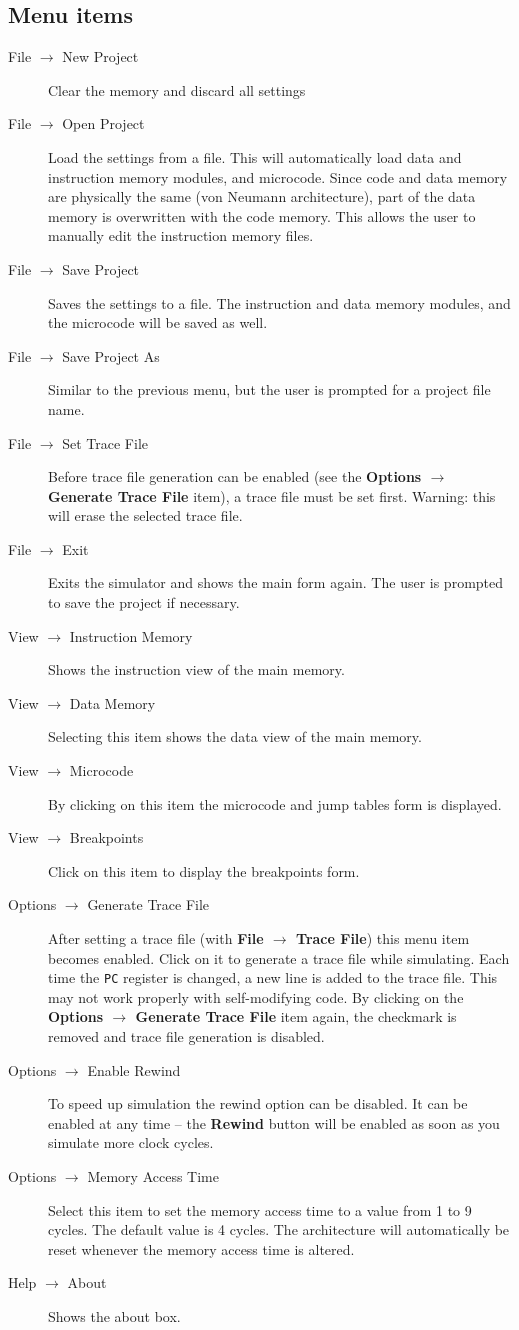 \documentclass{article}
\begin{document}
\subsection{Menu items}

\begin{description}
\item[File $\to$ New Project] Clear the memory and discard all settings
\item[File $\to$ Open Project] Load the settings from a
 file. This will automatically load data and instruction memory modules,
 and microcode. Since code and data memory are physically the same (von 
Neumann architecture), part of the data memory is overwritten with the 
code memory. This allows the user to manually edit the instruction 
memory files.
\item[File $\to$ Save Project] Saves the settings to a file. The instruction and data memory modules, and the microcode will be saved as well.
\item[File $\to$ Save Project As] Similar to the previous menu, but the user is prompted for a project file name.
\item[File $\to$ Set Trace File] Before trace file generation can be enabled (see the \textbf{Options $\to$ Generate Trace File} item), a trace file must be set first. Warning: this will erase the selected trace file.
\item[File $\to$ Exit] Exits the simulator and shows the main form again. The user is prompted to save the project if necessary.
\item[View $\to$ Instruction Memory] Shows the instruction view of the main memory.
\item[View $\to$ Data Memory] Selecting this item shows the data view of the main memory.
\item[View $\to$ Microcode] By clicking on this item the microcode and jump tables form is displayed.
\item[View $\to$ Breakpoints] Click on this item to display the breakpoints form.
\item[Options $\to$ Generate Trace File] After setting a trace file (with \textbf{File $\to$ Trace File}) this menu item becomes enabled. Click on it to generate a trace file while simulating. Each time the \texttt{PC}
 register is changed, a new line is added to the trace file. This may 
not work properly with self-modifying code. By clicking on the \textbf{Options $\to$ Generate Trace File} item again, the checkmark is removed and trace file generation is disabled.
\item[Options $\to$ Enable Rewind] To speed up simulation the rewind option can be disabled. It can be enabled at any time -- the \textbf{Rewind} button will be enabled as soon as you simulate more clock cycles.
\item[Options $\to$ Memory Access Time] Select this 
item to set the memory access time to a value from 1 to 9 cycles. The 
default value is 4 cycles. The architecture will automatically be reset 
whenever the memory access time is altered.
\item[Help $\to$ About] Shows the about box.
\end{description}
\end{document}

